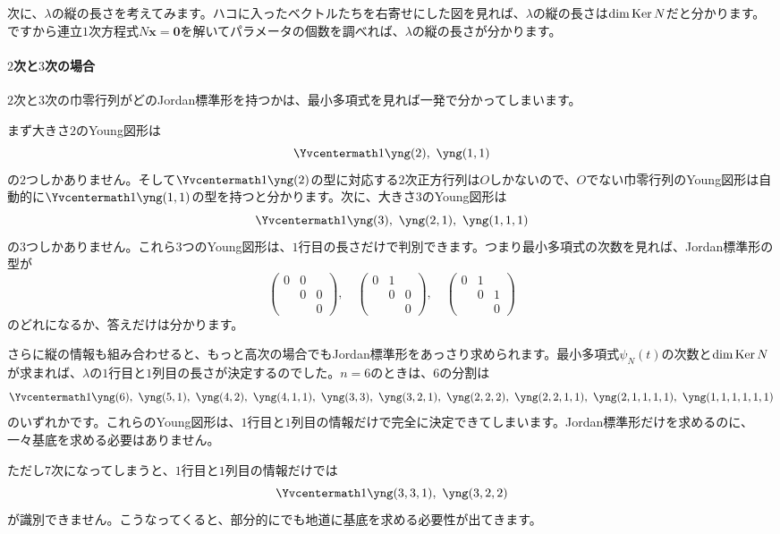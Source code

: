 次に、$\lambda$の縦の長さを考えてみます。ハコに入ったベクトルたちを右寄せにした図を見れば、$\lambda$の縦の長さは$\dim \operatorname{Ker} N$だと分かります。ですから連立$1$次方程式$N\bm{x} = \bm{0}$を解いてパラメータの個数を調べれば、$\lambda$の縦の長さが分かります。

\paragraph{$2$次と$3$次の場合}

$2$次と$3$次の巾零行列がどのJordan標準形を持つかは、最小多項式を見れば一発で分かってしまいます。

まず大きさ$2$のYoung図形は
\[
\Yvcentermath1 \yng(2),\ \yng(1,1)
\]
の$2$つしかありません。そして$\Yvcentermath1\yng(2)$の型に対応する$2$次正方行列は$O$しかないので、$O$でない巾零行列のYoung図形は自動的に$\Yvcentermath1\yng(1,1)$の型を持つと分かります。次に、大きさ$3$のYoung図形は
\[
\Yvcentermath1 \yng(3),\ \yng(2,1),\ \yng(1,1,1)
\]
の$3$つしかありません。これら$3$つのYoung図形は、$1$行目の長さだけで判別できます。つまり最小多項式の次数を見れば、Jordan標準形の型が
\[
\begin{pmatrix}
0 & 0 \\
 & 0 & 0 \\
 & & 0
\end{pmatrix}, \quad
\begin{pmatrix}
0 & 1 \\
 & 0 & 0 \\
 & & 0
\end{pmatrix}, \quad
\begin{pmatrix}
0 & 1 \\
 & 0 & 1 \\
 & & 0
\end{pmatrix}
\]
のどれになるか、答えだけは分かります。

さらに縦の情報も組み合わせると、もっと高次の場合でもJordan標準形をあっさり求められます。最小多項式$\psi_N(t)$の次数と$\dim \operatorname{Ker} N$が求まれば、$\lambda$の$1$行目と$1$列目の長さが決定するのでした。$n = 6$のときは、$6$の分割は
\[
\Yvcentermath1 \yng(6),\ \yng(5,1),\  \yng(4,2),\  \yng(4,1,1),\ 
\yng(3,3),\  \yng(3,2,1),\  \yng(2,2,2),\  \yng(2,2,1,1),\  \yng(2,1,1,1,1),\  \yng(1,1,1,1,1,1)
\]
のいずれかです。これらのYoung図形は、$1$行目と$1$列目の情報だけで完全に決定できてしまいます。Jordan標準形だけを求めるのに、一々基底を求める必要はありません。

ただし$7$次になってしまうと、$1$行目と$1$列目の情報だけでは
\[
\Yvcentermath1 \yng(3,3,1),\  \yng(3,2,2)
\]
が識別できません。こうなってくると、部分的にでも地道に基底を求める必要性が出てきます。

